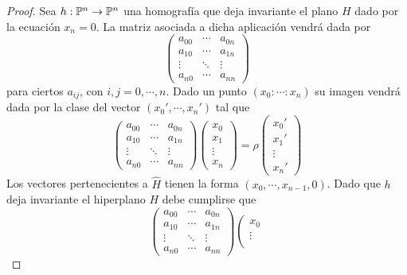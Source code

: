 \begin{proof}
	Sea $h:\mathbb{P}^n\rightarrow \mathbb{P}^n$ una homografía que deja invariante el plano $H$ dado por la ecuación $x_n=0$. La matriz asociada a dicha aplicación vendrá dada por
	\begin{equation*}
		\left( \begin{array}{ccc}
			a_{00}&\cdots&a_{0n}\\
			a_{10}&\cdots&a_{1n}\\
			\vdots&\ddots&\vdots\\
			a_{n0}&\cdots&a_{nn}
		\end{array}\right) 
	\end{equation*}
	para ciertos $a_{ij}$, con $i,j=0,\cdots,n$. Dado un punto $(x_0:\cdots:x_n)$ su imagen vendrá dada por la clase del vector $(x_0',\cdots,x_n')$ tal que
	\begin{equation*}
		\left( \begin{array}{ccc}
			a_{00}&\cdots&a_{0n}\\
			a_{10}&\cdots&a_{1n}\\
			\vdots&\ddots&\vdots\\
			a_{n0}&\cdots&a_{nn}
		\end{array}\right) 
		\left( \begin{array}{c}
			x_0\\
			x_1\\
			\vdots\\
			x_n
		\end{array}\right) =\rho
		\left( \begin{array}{c}
			x_0'\\
			x_1'\\
			\vdots\\
			x_n'
		\end{array}\right)
	\end{equation*}
	Los vectores pertenecientes a $\widehat{H}$ tienen la forma $(x_0,\cdots,x_{n-1},0)$. Dado que $h$ deja invariante el hiperplano $H$ debe cumplirse que
	\begin{equation*}
		\left( \begin{array}{ccc}
			a_{00}&\cdots&a_{0n}\\
			a_{10}&\cdots&a_{1n}\\
			\vdots&\ddots&\vdots\\
			a_{n0}&\cdots&a_{nn}
		\end{array}\right) 
		\left( \begin{array}{c}
			x_0\\
			\vdots\\

\end{array}
\end{equation*}
\end{proof}
